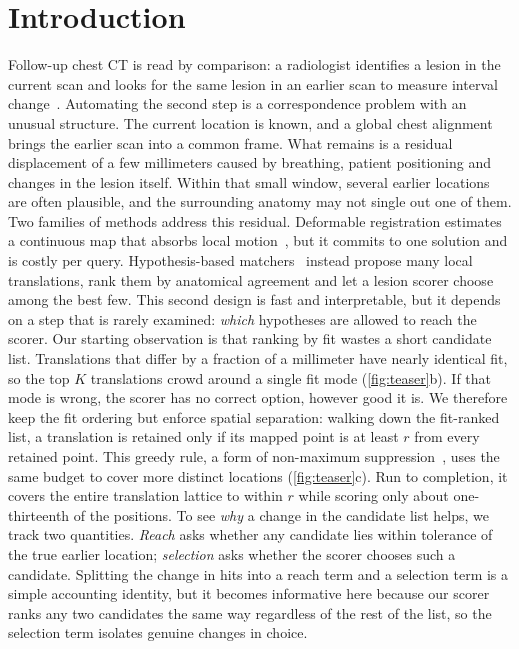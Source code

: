\section{Introduction}

Follow-up chest CT is read by comparison: a radiologist identifies a lesion in the current scan and looks for the same lesion in an earlier scan to measure interval change~\cite{rafaelpalou2021,sofka2010}.
Automating the second step is a correspondence problem with an unusual structure.
The current location is known, and a global chest alignment brings the earlier scan into a common frame.
What remains is a residual displacement of a few millimeters caused by breathing, patient positioning and changes in the lesion itself.
Within that small window, several earlier locations are often plausible, and the surrounding anatomy may not single out one of them. Two families of methods address this residual.
Deformable registration estimates a continuous map that absorbs local motion~\cite{rueckert1999,ghazipour20213}, but it commits to one solution and is costly per query.
Hypothesis-based matchers~\cite{sofka2010} instead propose many local translations, rank them by anatomical agreement and let a lesion scorer choose among the best few.
This second design is fast and interpretable, but it depends on a step that is rarely examined: \emph{which} hypotheses are allowed to reach the scorer. Our starting observation is that ranking by fit wastes a short candidate list.
Translations that differ by a fraction of a millimeter have nearly identical fit, so the top $K$ translations crowd around a single fit mode (\cref{fig:teaser}b).
If that mode is wrong, the scorer has no correct option, however good it is.
We therefore keep the fit ordering but enforce spatial separation: walking down the fit-ranked list, a translation is retained only if its mapped point is at least $r$ from every retained point.
This greedy rule, a form of non-maximum suppression~\cite{neubeck2006nms}, uses the same budget to cover more distinct locations (\cref{fig:teaser}c).
Run to completion, it covers the entire translation lattice to within $r$ while scoring only about one-thirteenth of the positions. To see \emph{why} a change in the candidate list helps, we track two quantities.
\emph{Reach} asks whether any candidate lies within tolerance of the true earlier location; \emph{selection} asks whether the scorer chooses such a candidate.
Splitting the change in hits into a reach term and a selection term is a simple accounting identity, but it becomes informative here because our scorer ranks any two candidates the same way regardless of the rest of the list, so the selection term isolates genuine changes in choice.
